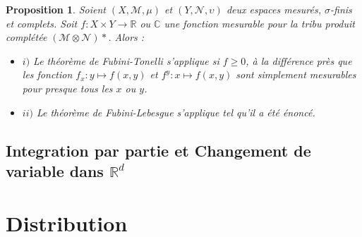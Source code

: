 \documentclass[3pt]{article}
\newtheorem{proposition}[theorem]{Proposition}
\begin{document}
\bigskip 

\begin{proposition}
Soient $(X,\mathcal{M},\mu )$ et $(Y,\mathcal{N},\upsilon )$ deux espaces
mesur\'{e}s, $\sigma $-finis et complets. Soit $f:X\times Y\rightarrow 
\mathbb{R}$ ou $\mathbb{C}$ une fonction mesurable pour la tribu produit
compl\'{e}t\'{e}e $(\mathcal{M}\otimes \mathcal{N})\ast $. Alors :

\begin{itemize}
\item $i)$ Le th\'{e}or\`{e}me de Fubini-Tonelli s'applique si $f\geq 0$, 
\`{a} la diff\'{e}rence pr\`{e}s que les fonction $f_{x}:y\mapsto f(x,y)$ et 
$f^{y}:x\mapsto f(x,y)$ sont simplement mesurables pour presque tous les $x$
ou $y$.

\item $ii)$ Le th\'{e}or\`{e}me de Fubini-Lebesgue s'applique tel qu'il a 
\'{e}t\'{e} \'{e}nonc\'{e}.
\end{itemize}
\end{proposition}

\subsection{Integration par partie et Changement de variable dans $\mathbb{R}%
^{d}$}

\bigskip

\bigskip

\bigskip

\bigskip

\bigskip

\section{Distribution}
\end{document}

